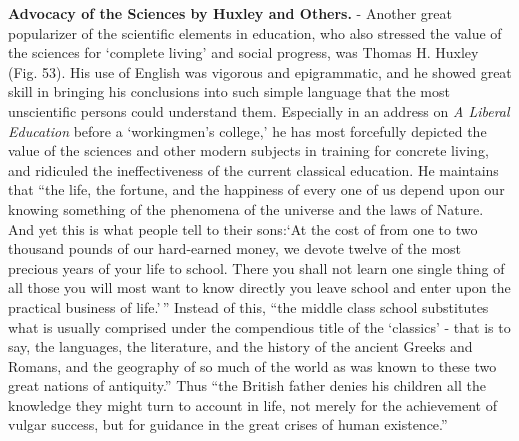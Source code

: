 \documentclass[]{book}
\begin{document}
\textbf{Advocacy of the Sciences by Huxley and Others.} - Another great popularizer of the scientific elements in education, who also stressed the value of the sciences for `complete living' and social progress, was Thomas H. Huxley (Fig. 53). His use of English was vigorous and epigrammatic, and he showed great skill in bringing his conclusions into such simple language that the most unscientific persons could understand them. Especially in an address on \emph{A Liberal Education} before a `workingmen's college,' he has most forcefully depicted the value of the sciences and other modern subjects in training for concrete living, and ridiculed the ineffectiveness of the current classical education. He maintains that ``the life, the fortune, and the happiness of every one of us depend upon our knowing something of the phenomena of the universe and the laws of Nature. And yet this is what people tell to their sons:`At the cost of from one to two thousand pounds of our hard-earned money, we devote twelve of the most precious years of your life to school. There you shall not learn one single thing of all those you will most want to know directly you leave school and enter upon the practical business of life.'\,'' Instead of this, ``the middle class school substitutes what is usually comprised under the compendious title of the `classics' - that is to say, the languages, the literature, and the history of the ancient Greeks and Romans, and the geography of so much of the world as was known to these two great nations of antiquity.'' Thus ``the British father denies his children all the knowledge they might turn to account in life, not merely for the achievement of vulgar success, but for guidance in the great crises of human existence.''
\end{document}
